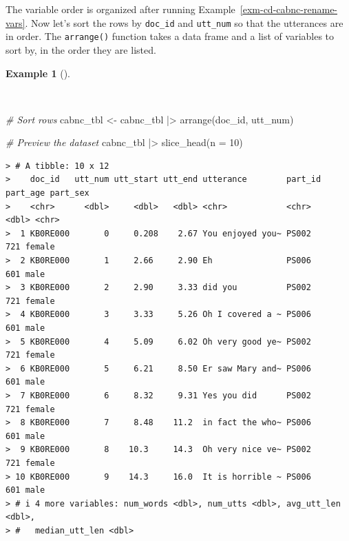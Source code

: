 \documentclass[
  letterpaper,
  DIV=11,
  numbers=noendperiod]{scrreport}
\newenvironment{Shaded}{\begin{snugshade}}{\end{snugshade}}
\newcommand{\AttributeTok}[1]{\textcolor[rgb]{0.00,0.00,0.00}{#1}}
\newcommand{\CommentTok}[1]{\textcolor[rgb]{0.00,0.00,0.00}{\textit{#1}}}
\newcommand{\DecValTok}[1]{\textcolor[rgb]{0.00,0.00,0.00}{#1}}
\newcommand{\FunctionTok}[1]{\textcolor[rgb]{0.00,0.00,0.00}{#1}}
\newcommand{\NormalTok}[1]{\textcolor[rgb]{0.00,0.00,0.00}{#1}}
\newcommand{\OtherTok}[1]{\textcolor[rgb]{0.00,0.00,0.00}{#1}}
\newcommand{\SpecialCharTok}[1]{\textcolor[rgb]{0.00,0.00,0.00}{#1}}
\theoremstyle{definition}
\newtheorem{example}{Example}[chapter]
\theoremstyle{remark}
\begin{document}
The variable order is organized after running
Example~\ref{exm-cd-cabnc-rename-vars}. Now let's sort the rows by
\texttt{doc\_id} and \texttt{utt\_num} so that the utterances are in
order. The \texttt{arrange()} function takes a data frame and a list of
variables to sort by, in the order they are listed.

\begin{example}[]\protect\hypertarget{exm-cd-cabnc-sort-rows}{}\label{exm-cd-cabnc-sort-rows}

~

\begin{Shaded}
\begin{Highlighting}[]
\CommentTok{\# Sort rows}
\NormalTok{cabnc\_tbl }\OtherTok{\textless{}{-}}
\NormalTok{  cabnc\_tbl }\SpecialCharTok{|\textgreater{}}
  \FunctionTok{arrange}\NormalTok{(doc\_id, utt\_num)}

\CommentTok{\# Preview the dataset}
\NormalTok{cabnc\_tbl }\SpecialCharTok{|\textgreater{}} 
  \FunctionTok{slice\_head}\NormalTok{(}\AttributeTok{n =} \DecValTok{10}\NormalTok{)}
\end{Highlighting}
\end{Shaded}

\begin{verbatim}
> # A tibble: 10 x 12
>    doc_id   utt_num utt_start utt_end utterance        part_id part_age part_sex
>    <chr>      <dbl>     <dbl>   <dbl> <chr>            <chr>      <dbl> <chr>   
>  1 KB0RE000       0     0.208    2.67 You enjoyed you~ PS002        721 female  
>  2 KB0RE000       1     2.66     2.90 Eh               PS006        601 male    
>  3 KB0RE000       2     2.90     3.33 did you          PS002        721 female  
>  4 KB0RE000       3     3.33     5.26 Oh I covered a ~ PS006        601 male    
>  5 KB0RE000       4     5.09     6.02 Oh very good ye~ PS002        721 female  
>  6 KB0RE000       5     6.21     8.50 Er saw Mary and~ PS006        601 male    
>  7 KB0RE000       6     8.32     9.31 Yes you did      PS002        721 female  
>  8 KB0RE000       7     8.48    11.2  in fact the who~ PS006        601 male    
>  9 KB0RE000       8    10.3     14.3  Oh very nice ve~ PS002        721 female  
> 10 KB0RE000       9    14.3     16.0  It is horrible ~ PS006        601 male    
> # i 4 more variables: num_words <dbl>, num_utts <dbl>, avg_utt_len <dbl>,
> #   median_utt_len <dbl>
\end{verbatim}

\end{example}
\end{document}
